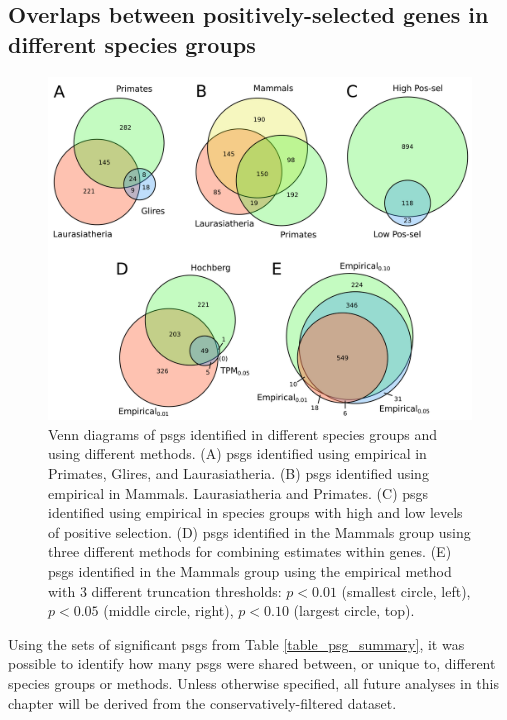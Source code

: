 \subsection{Overlaps between positively-selected genes in different species groups}

\begin{figure}
\centering
\includegraphics[scale=0.3]{Figs/psg_venns.pdf}
\caption{Venn diagrams of \acp{psg} identified in different species
  groups and using different methods. (A) \acp{psg} identified using
  empirical \pvs in Primates, Glires, and Laurasiatheria. (B)
  \acp{psg} identified using empirical \pvs in
  Mammals. Laurasiatheria and Primates. (C) \acp{psg} identified using
  empirical \pvs in species groups with high and low levels of
  positive selection. (D) \acp{psg} identified in the Mammals group
  using three different methods for combining \sw estimates within
  genes. (E) \acp{psg} identified in the Mammals group using the
  empirical \pv method with 3 different truncation thresholds:
  $p<0.01$ (smallest circle, left), $p<0.05$ (middle circle, right),
  $p<0.10$ (largest circle, top).}
\label{fig_psg_venns}
\end{figure}

Using the sets of significant \acp{psg} from Table
\ref{table_psg_summary}, it was possible to identify how many
\acp{psg} were shared between, or unique to, different species groups
or methods. Unless otherwise specified, all future analyses in this
chapter will be derived from the conservatively-filtered dataset.

